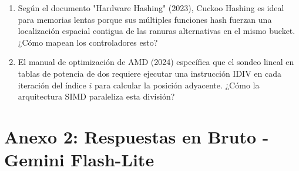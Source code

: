 \documentclass[12pt,a4paper]{report}
\begin{document}
\begin{enumerate}
    \item Según el documento "Hardware Hashing" (2023), Cuckoo Hashing es ideal para memorias lentas porque sus múltiples funciones hash fuerzan una localización espacial contigua de las ranuras alternativas en el mismo bucket. ¿Cómo mapean los controladores esto?
    \item El manual de optimización de AMD (2024) específica que el sondeo lineal en tablas de potencia de dos requiere ejecutar una instrucción IDIV en cada iteración del índice $i$ para calcular la posición adyacente. ¿Cómo la arquitectura SIMD paraleliza esta división?
\end{enumerate}

\section{Anexo 2: Respuestas en Bruto - Gemini Flash-Lite}
\end{document}
